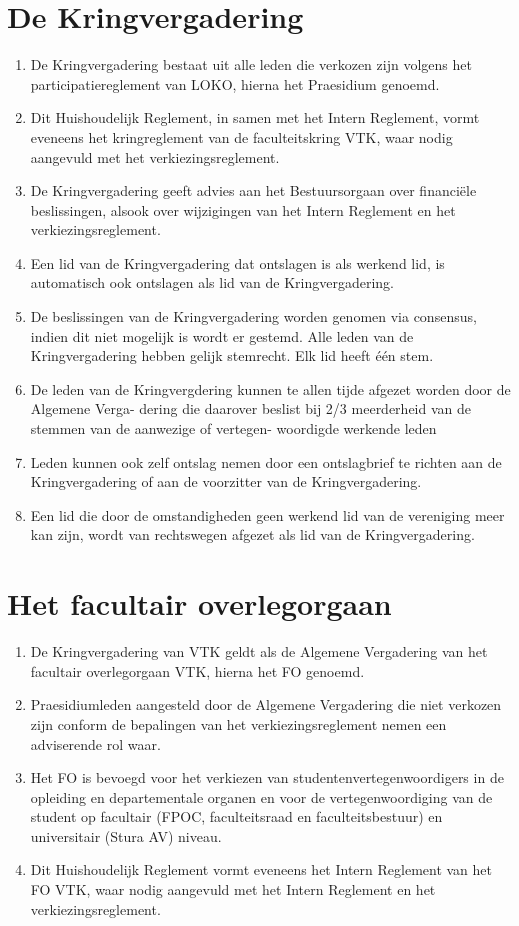 \section{De Kringvergadering}
\begin{enumerate}
    \item De Kringvergadering bestaat uit alle leden die verkozen zijn volgens het participatiereglement van LOKO, hierna het Praesidium genoemd.
    \item Dit Huishoudelijk Reglement, in samen met het Intern Reglement, vormt eveneens het kringreglement van de faculteitskring VTK, waar nodig aangevuld met het verkiezingsreglement. 
    \item De Kringvergadering geeft advies aan het Bestuursorgaan over financi\"ele beslissingen, alsook over wijzigingen van het Intern Reglement en het verkiezingsreglement.
    \item Een lid van de Kringvergadering dat ontslagen is als werkend lid, is automatisch ook ontslagen als lid van de Kringvergadering. 
    \item De beslissingen van de Kringvergadering worden genomen via consensus, indien dit niet mogelijk
is wordt er gestemd. Alle leden van de Kringvergadering hebben gelijk stemrecht. Elk lid heeft
één stem.
    \item De leden van de Kringvergdering kunnen te allen tijde afgezet worden door de Algemene Verga-
dering die daarover beslist bij 2/3 meerderheid van de stemmen van de aanwezige of vertegen-
woordigde werkende leden
    \item Leden kunnen ook zelf ontslag nemen door een ontslagbrief te richten aan de Kringvergadering of
aan de voorzitter van de Kringvergadering.
    \item Een lid die door de omstandigheden geen werkend lid van de vereniging meer kan zijn, wordt van
rechtswegen afgezet als lid van de Kringvergadering.
\end{enumerate}

\section{Het facultair overlegorgaan}
\begin{enumerate}
    \item De Kringvergadering van VTK geldt als de Algemene Vergadering van het facultair overlegorgaan VTK, hierna het FO genoemd. 
    \item Praesidiumleden aangesteld door de Algemene Vergadering die niet verkozen zijn conform de bepalingen van het verkiezingsreglement nemen een adviserende rol waar.
    \item Het FO is bevoegd voor het verkiezen van studentenvertegenwoordigers in de opleiding en departementale organen en voor de vertegenwoordiging van de student op facultair (FPOC, faculteitsraad en faculteitsbestuur) en universitair (Stura AV) niveau.
    \item Dit Huishoudelijk Reglement vormt eveneens het Intern Reglement van het FO VTK, waar nodig aangevuld met het Intern Reglement en het verkiezingsreglement.
\end{enumerate}

